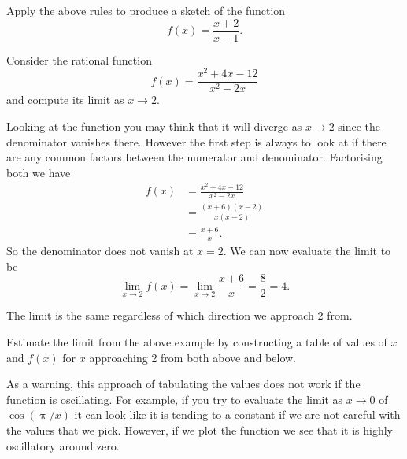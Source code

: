 \begin{exercise}
Apply the above rules to produce a sketch of the function
\begin{equation*}
f(x)=\frac{x+2}{x-1}.
\end{equation*}
\end{exercise}

\begin{ex}
Consider the rational function 
\begin{equation*}
f(x)=\frac{x^{2}+4x-12}{x^{2}-2x}
\end{equation*}
and compute its limit as $x\to 2$.

Looking at the function you may think that it will diverge as $x\to 2$ since the denominator vanishes there. However the first step is always to look at if there are any common factors between the numerator and denominator. Factorising both we have
\begin{align*}
f(x)&=\frac{x^{2}+4x-12}{x^{2}-2x}\\
&=\frac{(x+6)(x-2)}{x(x-2)}\\
&=\frac{x+6}{x}.
\end{align*}
So the denominator does not vanish at $x=2$. We can now evaluate the limit to be
\begin{equation*}
\lim_{x\to 2}f(x)=\lim_{x\to 2}\frac{x+6}{x}=\frac{8}{2}=4.
\end{equation*}

The limit is the same regardless of which direction we approach $2$ from.
\end{ex}

\begin{exercise}
Estimate the limit from the above example by constructing a table of values of $x$ and $f(x)$ for $x$ approaching 2 from both above and below.
\end{exercise}

As a warning, this approach of tabulating the values does not work if the function is oscillating. For example, if you try to evaluate the limit as $x\to 0$ of $\cos\left(\uppi/x\right)$ it can look like it is tending to a constant if we are not careful with the values that we pick. However, if we plot the function we see that it is highly oscillatory around zero.

